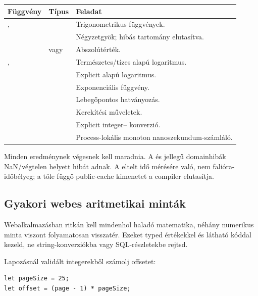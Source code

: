 \begin{center}
\begin{tabularx}{\textwidth}{@{}l l Y@{}}
\toprule
\textbf{Függvény} & \textbf{Típus} & \textbf{Feladat} \\
\midrule
{},  &  & Trigonometrikus függvények. \\
 &  & Négyzetgyök; hibás tartomány elutasítva. \\
 &  vagy  & Abszolútérték. \\
,  &  & Természetes/tízes alapú logaritmus. \\
 &  & Explicit alapú logaritmus. \\
 &  & Exponenciális függvény. \\
 &  & Lebegőpontos hatványozás. \\
 &  & Kerekítési műveletek. \\
 &  & Explicit integer-- konverzió. \\
 &  & Process-lokális monoton nanoszekundum-számláló. \\
\bottomrule
\end{tabularx}
\end{center}

Minden  eredménynek végesnek kell maradnia. A  és  jellegű domainhibák NaN/végtelen helyett hibát adnak. A  eltelt idő mérésére való, nem falióra-időbélyeg; a tőle függő public-cache kimenetet a compiler elutasítja.

\subsection*{Gyakori webes aritmetikai minták}

Webalkalmazásban ritkán kell mindenhol haladó matematika, néhány numerikus minta viszont folyamatosan visszatér. Ezeket typed értékekkel és látható kóddal kezeld, ne string-konverziókba vagy SQL-részletekbe rejtsd.

Lapozásnál validált integerekből számolj offsetet:

\begin{lstlisting}[language=RWLang]
let pageSize = 25;
let offset = (page - 1) * pageSize;
\end{lstlisting}

